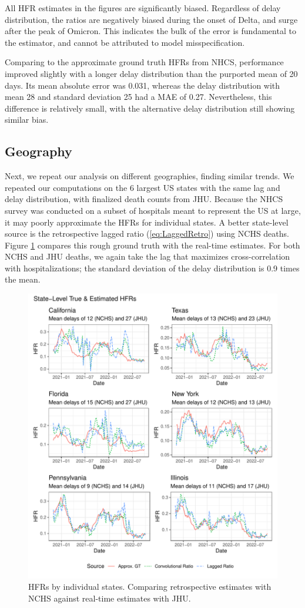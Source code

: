 \documentclass{article}
\begin{document}
All HFR estimates in the figures are significantly biased. Regardless of delay distribution, the ratios are negatively biased during the onset of Delta, and surge after the peak of Omicron. This indicates the bulk of the error is fundamental to the estimator, and cannot be attributed to model misspecification. 

Comparing to the approximate ground truth HFRs from NHCS, performance improved slightly with a longer delay distribution than the purported mean of 20 days. Its mean absolute error was 0.031, whereas the delay distribution with mean 28 and standard deviation 25 had a MAE of 0.27. Nevertheless, this difference is relatively small, with the alternative delay distribution still showing similar bias.

\subsection{Geography}

Next, we repeat our analysis on different geographies, finding similar trends. We repeated our computations on the 6 largest US states with the same lag and delay distribution, with finalized death counts from JHU. Because the NHCS survey was conducted on a subset of hospitals meant to represent the US at large, it may poorly approximate the HFRs for individual states. A better state-level source is the retrospective lagged ratio (\ref{eq:LaggedRetro}) using NCHS deaths. Figure \ref{fig:state-level} compares this rough ground truth with the real-time estimates. For both NCHS and JHU deaths, we again take the lag that maximizes cross-correlation with hospitalizations; the standard deviation of the delay distribution is 0.9 times the mean. 

 \begin{figure}
     \centering
     \includegraphics[width=0.8\linewidth]{Figs/Real/state_level_hfrs.pdf}
     \caption{HFRs by individual states. Comparing retrospective estimates with NCHS against real-time estimates with JHU.}
     \label{fig:state-level}
 \end{figure}
\end{document}
